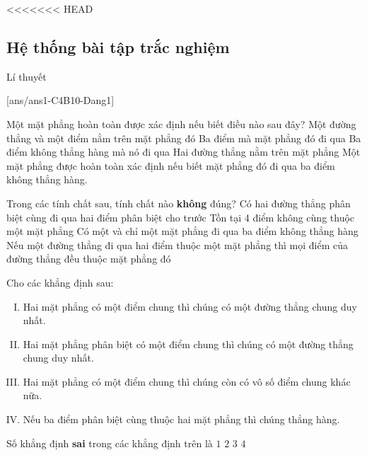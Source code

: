 <<<<<<< HEAD
\subsection{Hệ thống bài tập trắc nghiệm}
\setcounter{dang}{0}
\begin{dang}{Lí thuyết}
\end{dang}
[ans/ans1-C4B10-Dang1]
\begin{ex}%
Một mặt phẳng hoàn toàn được xác định nếu biết điều nào sau đây?
\choice
{Một đường thẳng và một điểm nằm trên mặt phẳng đó}
{Ba điểm mà mặt phẳng đó đi qua}
{\True Ba điểm không thẳng hàng mà nó đi qua}
{Hai đường thẳng nằm trên mặt phẳng}
\loigiai
{ 
Một mặt phẳng được hoàn toàn xác định nếu biết mặt phẳng đó đi qua ba điểm không thẳng hàng.
}
\end{ex}

\begin{ex}%
	Trong các tính chất sau, tính chất nào {\bf không} đúng?
	\choice
	{\True Có hai đường thẳng phân biệt cùng đi qua hai điểm phân biệt cho trước}
	{Tồn tại 4 điểm không cùng thuộc một mặt phẳng}
	{Có một và chỉ một mặt phẳng đi qua ba điểm không thẳng hàng}
	{Nếu một đường thẳng đi qua hai điểm thuộc một mặt phẳng thì mọi điểm của đường thẳng đều thuộc mặt phẳng đó}
\end{ex}

\begin{ex}%
	Cho các khẳng định sau:
	\begin{enumerate}[(I)]
		\item Hai mặt phẳng có một điểm chung thì chúng có một đường thẳng chung duy nhất.
		\item Hai mặt phẳng phân biệt có một điểm chung thì chúng có một đường thẳng chung duy nhất.
		\item Hai mặt phẳng có một điểm chung thì chúng còn có vô số điểm chung khác nữa.
		\item Nếu ba điểm phân biệt cùng thuộc hai mặt phẳng thì chúng thẳng hàng.
	\end{enumerate}
	Số khẳng định {\bf sai} trong các khẳng định trên là
	\choice
	{$1$}
	{\True $2$}
	{$3$}
	{$4$}
\end{ex}


